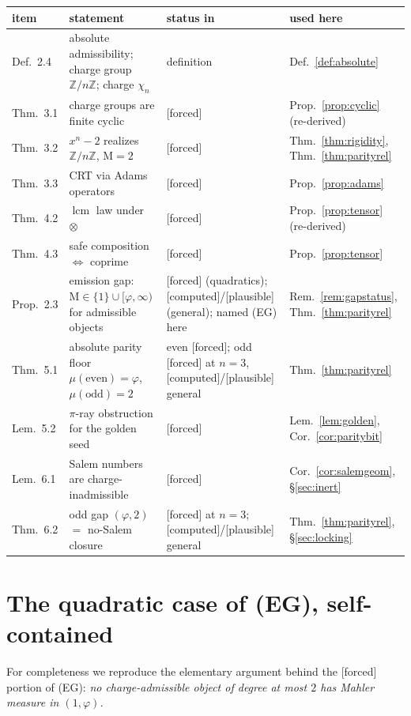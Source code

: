 \documentclass[11pt]{article}
\theoremstyle{plain}
\theoremstyle{definition}
\theoremstyle{remark}
\newcommand{\Z}{\mathbb{Z}}
\newcommand{\Mah}{\mathrm{M}}
\DeclareMathOperator{\lcm}{lcm}
\newcommand{\F}{\textnormal{[forced]}}
\newcommand{\C}{\textnormal{[computed]}}
\newcommand{\Pl}{\textnormal{[plausible]}}
\begin{document}
\begin{center}
\small
\begin{tabular}{lp{5.4cm}p{3.5cm}p{3.3cm}}
\hline
\cite{CMC} item & statement & status in \cite{CMC} & used here\\
\hline
Def.~2.4 & absolute admissibility; charge group $\Z/n\Z$; charge $\chi_n$ &
definition & Def.~\ref{def:absolute}\\[2pt]
Thm.~3.1 & charge groups are finite cyclic & \F &
Prop.~\ref{prop:cyclic} (re-derived)\\[2pt]
Thm.~3.2 & $x^n-2$ realizes $\Z/n\Z$, $\Mah=2$ & \F &
Thm.~\ref{thm:rigidity}, Thm.~\ref{thm:parityrel}\\[2pt]
Thm.~3.3 & CRT via Adams operators & \F & Prop.~\ref{prop:adams}\\[2pt]
Thm.~4.2 & $\lcm$ law under $\otimes$ & \F &
Prop.~\ref{prop:tensor} (re-derived)\\[2pt]
Thm.~4.3 & safe composition $\Leftrightarrow$ coprime & \F &
Prop.~\ref{prop:tensor}\\[2pt]
Prop.~2.3 & emission gap: $\Mah\in\{1\}\cup[\varphi,\infty)$ for
admissible objects & \F{} (quadratics); \C/\Pl{} (general); named
\textup{(EG)} here &
Rem.~\ref{rem:gapstatus}, Thm.~\ref{thm:parityrel}\\[2pt]
Thm.~5.1 & absolute parity floor $\mu(\mathrm{even})=\varphi$,
$\mu(\mathrm{odd})=2$ & even \F; odd \F{} at $n=3$, \C/\Pl{} general &
Thm.~\ref{thm:parityrel}\\[2pt]
Lem.~5.2 & $\pi$-ray obstruction for the golden seed & \F &
Lem.~\ref{lem:golden}, Cor.~\ref{cor:paritybit}\\[2pt]
Lem.~6.1 & Salem numbers are charge-inadmissible & \F &
Cor.~\ref{cor:salemgeom}, \S\ref{sec:inert}\\[2pt]
Thm.~6.2 & odd gap $(\varphi,2)$ $=$ no-Salem closure & \F{} at $n=3$;
\C/\Pl{} general & Thm.~\ref{thm:parityrel}, \S\ref{sec:locking}\\
\hline
\end{tabular}
\end{center}

\section{The quadratic case of \textup{(EG)}, self-contained}
\label{app:quadEG}

For completeness we reproduce the elementary argument behind the \F{} portion
of \textup{(EG)}: \emph{no charge-admissible object of degree at most $2$ has
Mahler measure in $(1,\varphi)$.}
\end{document}
